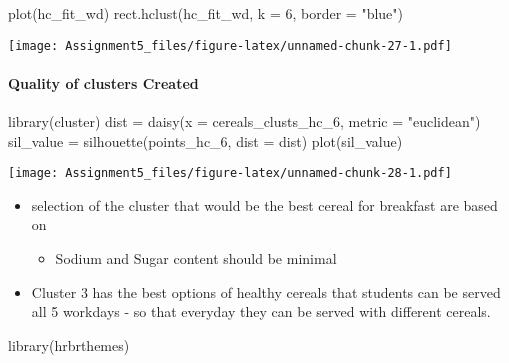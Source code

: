 \documentclass[
]{article}
\newenvironment{Shaded}{\begin{snugshade}}{\end{snugshade}}
\newcommand{\AttributeTok}[1]{\textcolor[rgb]{0.77,0.63,0.00}{#1}}
\newcommand{\DecValTok}[1]{\textcolor[rgb]{0.00,0.00,0.81}{#1}}
\newcommand{\FunctionTok}[1]{\textcolor[rgb]{0.00,0.00,0.00}{#1}}
\newcommand{\NormalTok}[1]{#1}
\newcommand{\OtherTok}[1]{\textcolor[rgb]{0.56,0.35,0.01}{#1}}
\newcommand{\StringTok}[1]{\textcolor[rgb]{0.31,0.60,0.02}{#1}}
\providecommand{\tightlist}{%
  \setlength{\itemsep}{0pt}\setlength{\parskip}{0pt}}
\begin{document}
\begin{Shaded}
\begin{Highlighting}[]
\FunctionTok{plot}\NormalTok{(hc\_fit\_wd)}
\FunctionTok{rect.hclust}\NormalTok{(hc\_fit\_wd, }\AttributeTok{k =} \DecValTok{6}\NormalTok{, }\AttributeTok{border =} \StringTok{"blue"}\NormalTok{)}
\end{Highlighting}
\end{Shaded}

\texttt{[image: Assignment5\_files/figure-latex/unnamed-chunk-27-1.pdf]}

\hypertarget{quality-of-clusters-created-1}{%
\paragraph{Quality of clusters
Created}\label{quality-of-clusters-created-1}}

\begin{Shaded}
\begin{Highlighting}[]
\FunctionTok{library}\NormalTok{(cluster)}
\NormalTok{dist }\OtherTok{=} \FunctionTok{daisy}\NormalTok{(}\AttributeTok{x =}\NormalTok{ cereals\_clusts\_hc\_6, }\AttributeTok{metric =} \StringTok{"euclidean"}\NormalTok{)}
\NormalTok{sil\_value }\OtherTok{=} \FunctionTok{silhouette}\NormalTok{(points\_hc\_6, }\AttributeTok{dist =}\NormalTok{ dist)}
\FunctionTok{plot}\NormalTok{(sil\_value)}
\end{Highlighting}
\end{Shaded}

\texttt{[image: Assignment5\_files/figure-latex/unnamed-chunk-28-1.pdf]}

\begin{itemize}
\tightlist
\item
  selection of the cluster that would be the best cereal for breakfast
  are based on

  \begin{itemize}
  \tightlist
  \item
    Sodium and Sugar content should be minimal
  \end{itemize}
\item
  Cluster 3 has the best options of healthy cereals that students can be
  served all 5 workdays - so that everyday they can be served with
  different cereals.
\end{itemize}

\begin{Shaded}
\begin{Highlighting}[]
\FunctionTok{library}\NormalTok{(hrbrthemes)}
\end{Highlighting}
\end{Shaded}
\end{document}
